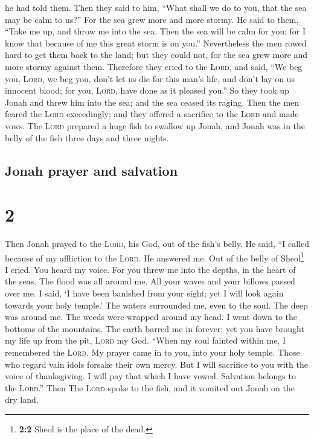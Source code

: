 he had told them.  Then they said to him, ``What shall we
do to you, that the sea may be calm to us?'' For the sea grew more and
more stormy.  He said to them, ``Take me up, and throw me
into the sea. Then the sea will be calm for you; for I know that because
of me this great storm is on you.''  Nevertheless the men
rowed hard to get them back to the land; but they could not, for the sea
grew more and more stormy against them.  Therefore they
cried to the \textsc{Lord}, and said, ``We beg you, \textsc{Lord}, we
beg you, don't let us die for this man's life, and don't lay on us
innocent blood; for you, \textsc{Lord}, have done as it pleased you.''
 So they took up Jonah and threw him into the sea; and
the sea ceased its raging.  Then the men feared the
\textsc{Lord} exceedingly; and they offered a sacrifice to the
\textsc{Lord} and made vows.  The \textsc{Lord} prepared
a huge fish to swallow up Jonah, and Jonah was in the belly of the fish
three days and three nights.

\hypertarget{jonah-prayer-and-salvation}{%
\subsection{Jonah prayer and
salvation}\label{jonah-prayer-and-salvation}}

\hypertarget{section-1}{%
\section{2}\label{section-1}}

 Then Jonah prayed to the \textsc{Lord}, his God, out of
the fish's belly.  He said, ``I called because of my
affliction to the \textsc{Lord}. He answered me. Out of the belly of
Sheol\footnote{\textbf{2:2} Sheol is the place of the dead.} I cried.
You heard my voice.  For you threw me into the depths, in
the heart of the seas. The flood was all around me. All your waves and
your billows passed over me.  I said, `I have been
banished from your sight; yet I will look again towards your holy
temple.'  The waters surrounded me, even to the soul. The
deep was around me. The weeds were wrapped around my head.
 I went down to the bottoms of the mountains. The earth
barred me in forever; yet you have brought my life up from the pit,
\textsc{Lord} my God.  ``When my soul fainted within me, I
remembered the \textsc{Lord}. My prayer came in to you, into your holy
temple.  Those who regard vain idols forsake their own
mercy.  But I will sacrifice to you with the voice of
thanksgiving. I will pay that which I have vowed. Salvation belongs to
the \textsc{Lord}.''  Then The \textsc{Lord} spoke to the
fish, and it vomited out Jonah on the dry land.

